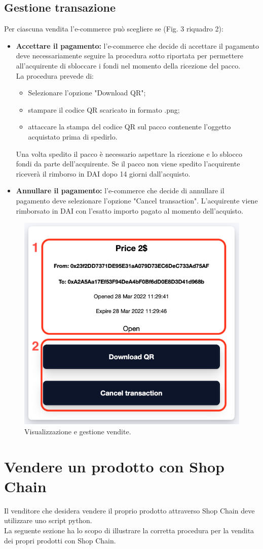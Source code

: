 \documentclass[a4paper, 12pt]{article}
\begin{document}
\subsection{Gestione transazione}
Per ciascuna vendita l'e-commerce può scegliere se (Fig. 3 riquadro 2):
\begin{itemize}
  \item \textbf{Accettare il pagamento:} l'e-commerce che decide di accettare il pagamento deve necessariamente seguire la procedura sotto riportata per permettere all'acquirente di sbloccare i fondi nel momento della ricezione del pacco.\\
  La procedura prevede di:
  \begin{itemize}
    \item Selezionare l'opzione "Download QR";
    \item stampare il codice QR scaricato in formato .png;
    \item attaccare la stampa del codice QR sul pacco contenente l'oggetto acquistato prima di spedirlo.
  \end{itemize}
  Una volta spedito il pacco è necessario aspettare la ricezione e lo sblocco fondi da parte dell'acquirente. Se il pacco non viene spedito l'acquirente riceverà il rimborso in DAI dopo 14 giorni dall'acquisto.\\
  \item \textbf{Annullare il pagamento:} l'e-commerce che decide di annullare il pagamento deve selezionare l'opzione "Cancel transaction". L'acquirente viene rimborsato in DAI con l'esatto importo pagato al momento dell'acquisto.
\end{itemize}
\FloatBarrier
\begin{figure}[!h]
\centering
\includegraphics[width=0.5\linewidth]{img/transazione_venditore.png}
\caption{Visualizzazione e gestione vendite.}
\end{figure}
\FloatBarrier
\section{Vendere un prodotto con Shop Chain}
Il venditore che desidera vendere il proprio prodotto attraverso Shop Chain deve utilizzare uno script python.
\\La seguente sezione ha lo scopo di illustrare la corretta procedura per la vendita dei propri prodotti con Shop Chain.
\end{document}
